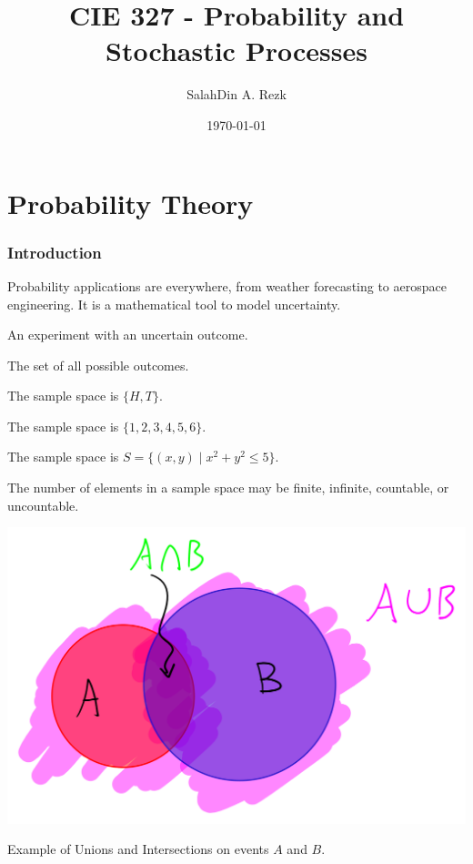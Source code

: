 \documentclass{article}
\title{CIE 327 - Probability and Stochastic Processes}
\author{SalahDin A. Rezk}
\affiliation{Zewail City of Science and Technology}
\date{\today}
\begin{document}
\maketitle

\part{Probability Theory}
\section{Introduction}

Probability applications are everywhere, from weather forecasting to aerospace engineering. It is a mathematical tool to model uncertainty. 

\begin{definition}
An experiment with an uncertain outcome.
\end{definition}

\begin{definition}
The set of all possible outcomes.
\end{definition}

\begin{example}
The sample space is $\{H, T\}$.
\end{example}

\begin{example}
The sample space is $\{1, 2, 3, 4, 5, 6\}$.
\end{example}

\begin{example}
The sample space is $S = \{(x, y) \mid x^2 + y^2 \leq 5\}$.
\end{example}

\begin{remark}
The number of elements in a sample space may be finite, infinite, countable, or uncountable.
\end{remark}

\begin{marginfigure}
  \centering
  \includegraphics[width=\textwidth]{images/image_20250108_001846.png}
  \caption{Example of Unions and Intersections on events \( A \) and \( B \).}
  \label{fig:unions_intersections}
\end{marginfigure}
\end{document}
